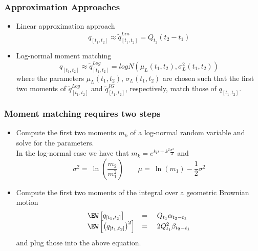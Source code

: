 \begin{frame}
  \frametitle{Approximation Approaches}
\begin{itemize}
\item<1-> Linear approximation approach
   $$
     q_{[t_1,t_2]} \approx \tilde{q}^{Lin}_{[t_1,t_2]} = Q_{t_2} (t_2 - t_1)
   $$
\item<2-> Log-normal moment matching
$$
q_{[t_1,t_2]} \approx \tilde{q}^{Log}_{[t_1,t_2]} = logN \left(\mu_L(t_1,t_2), \sigma^2_L(t_1,t_2) \right) \label{ECumApprox2}
$$
where the parameters $\mu_L(t_1,t_2)$, $\sigma_L(t_1,t_2)$ are chosen such that the first two moments of $\tilde{q}^{Log}_{[t_1,t_2]}$ and $\tilde{q}^{IG}_{[t_1,t_2]}$, respectively, match those of $q_{[t_1,t_2]}$.
\end{itemize}
\end{frame}

\begin{frame}
  \frametitle{Moment matching requires two steps}
    \begin{itemize}
   \item<1-> Compute the first two moments $m_k$ of a log-normal random variable and solve for the parameters. \\
     In the log-normal case we have that $m_k = e^{k\mu + k^2 \frac{\sigma^2}{2}}$ and
     $$
     \sigma^2 = \ \ln\left( \frac{m_2}{m^2_1}\right)  \qquad \mu = \ \ln(m_1) - \frac{1}{2}  \sigma^2
     $$
    \item<2-> Compute the first two moments of the integral over a geometric Brownian motion
    $$\begin{array}{lll}
\EW \left[ q_{[t_1,t_2]} \right] &=& \ Q_{t_1} \alpha_{t_2-t_1} \\
\EW \left[ \left( q_{[t_1,t_2]} \right)^2 \right] &=& \ 2 Q_{t_1}^2 \beta_{t_2-t_1}
\end{array}
$$
    and plug those into the above equation.
    \end{itemize}
\end{frame}


